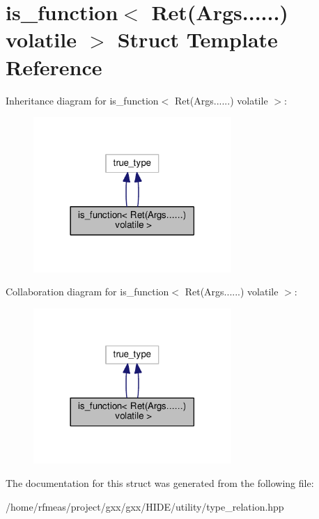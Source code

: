 \hypertarget{structis__function_3_01Ret_07Args_8_8_8_8_8_8_08_01volatile_01_4}{}\section{is\+\_\+function$<$ Ret(Args......) volatile $>$ Struct Template Reference}
\label{structis__function_3_01Ret_07Args_8_8_8_8_8_8_08_01volatile_01_4}


Inheritance diagram for is\+\_\+function$<$ Ret(Args......) volatile $>$\+:
\nopagebreak
\begin{figure}[H]
\begin{center}
\leavevmode
\includegraphics[width=213pt]{structis__function_3_01Ret_07Args_8_8_8_8_8_8_08_01volatile_01_4__inherit__graph}
\end{center}
\end{figure}


Collaboration diagram for is\+\_\+function$<$ Ret(Args......) volatile $>$\+:
\nopagebreak
\begin{figure}[H]
\begin{center}
\leavevmode
\includegraphics[width=213pt]{structis__function_3_01Ret_07Args_8_8_8_8_8_8_08_01volatile_01_4__coll__graph}
\end{center}
\end{figure}


The documentation for this struct was generated from the following file\+:\begin{DoxyCompactItemize}
\item 
/home/rfmeas/project/gxx/gxx/\+H\+I\+D\+E/utility/type\+\_\+relation.\+hpp\end{DoxyCompactItemize}
